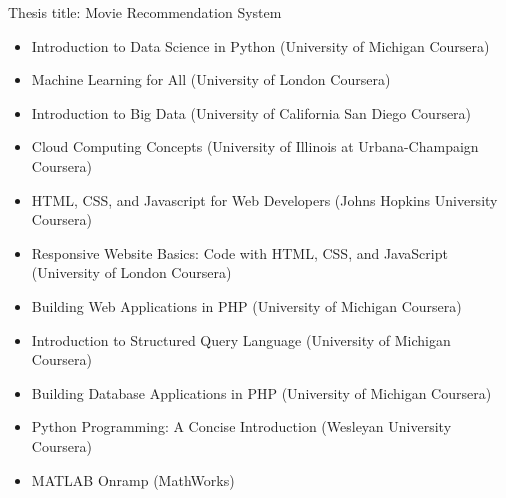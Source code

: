 \documentclass[10pt,a4paper,ragged2e,withhyper]{altacv}
\begin{document}
\begin{paracol}{2}
\divider


Thesis title: Movie Recommendation System
\medskip 
\vspace{10mm}


\begin{itemize}
\item Introduction to Data Science in Python (University of Michigan Coursera)
\item Machine Learning for All (University of London Coursera)
\item Introduction to Big Data (University of California San Diego Coursera)
\item Cloud Computing Concepts (University of Illinois at Urbana-Champaign Coursera)
\item HTML, CSS, and Javascript for Web Developers (Johns Hopkins University Coursera)
\item Responsive Website Basics: Code with HTML, CSS, and JavaScript (University of London Coursera)
\item Building Web Applications in PHP (University of Michigan Coursera)
\item Introduction to Structured Query Language (University of Michigan Coursera)
\item Building Database Applications in PHP (University of Michigan Coursera)
\item Python Programming: A Concise Introduction (Wesleyan University Coursera)
\item MATLAB Onramp (MathWorks)
\end{itemize}









\end{paracol}
\end{document}
